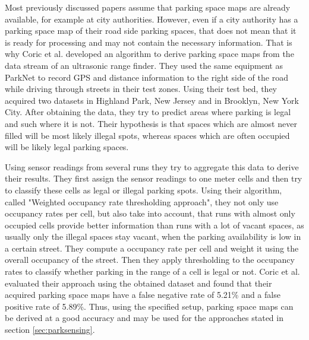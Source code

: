 Most previously discussed papers assume that parking space maps are already available, for example at city authorities. However, even if a city authority has a parking space map of their road side parking spaces, that does not mean that it is ready for processing and may not contain the necessary information. That is why Coric et al. \cite{Coric2013} developed an algorithm to derive parking space maps from the data stream of an ultrasonic range finder. They used the same equipment as ParkNet \cite{Mathur:2010:PDS:1814433.1814448} to record GPS and distance information to the right side of the road while driving through streets in their test zones. Using their test bed, they acquired two datasets in Highland Park, New Jersey and in Brooklyn, New York City. After obtaining the data, they try to predict areas where parking is legal and such where it is not. Their hypothesis is that spaces which are almost never filled will be most likely illegal spots, whereas spaces which are often occupied will be likely legal parking spaces.

Using sensor readings from several runs they try to aggregate this data to derive their results. They first assign the sensor readings to one meter cells and then try to classify these cells as legal or illegal parking spots. Using their algorithm, called "Weighted occupancy rate thresholding approach", they not only use occupancy rates per cell, but also take into account, that runs with almost only occupied cells provide better information than runs with a lot of vacant spaces, as usually only the illegal spaces stay vacant, when the parking availability is low in a certain street. They compute a occupancy rate per cell and weight it using the overall occupancy of the street. Then they apply thresholding to the occupancy rates to classify whether parking in the range of a cell is legal or not. Coric et al. evaluated their approach using the obtained dataset and found that their acquired parking space maps have a false negative rate of 5.21\% and a false positive rate of 5.89\%. Thus, using the specified setup, parking space maps can be derived at a good accuracy and may be used for the approaches stated in section
\ref{sec:parksensing}.

